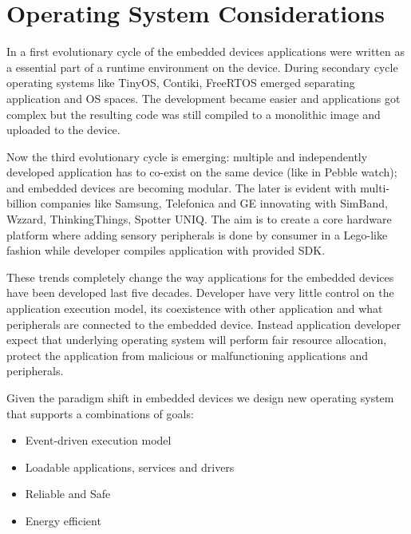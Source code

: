 \section{Operating System Considerations}
\label{os-considerations}

In a first evolutionary cycle of the embedded devices applications were written
as a essential part of a runtime environment on the device. During secondary
cycle operating systems like TinyOS, Contiki, FreeRTOS emerged separating
application and OS spaces. The development became easier  and applications
got complex but the resulting code was still compiled to a monolithic image and
uploaded to the device.

Now the third evolutionary cycle is emerging: multiple and independently
developed application has to co-exist on the same device (like in Pebble watch);
and embedded devices are becoming modular. The later is evident with
multi-billion companies like Samsung, Telefonica and GE innovating with SimBand, Wzzard, ThinkingThings, Spotter UNIQ.
The aim is to create a core hardware platform where adding sensory
peripherals is done by consumer in a Lego-like fashion while developer compiles
application with provided SDK.

These trends completely change the way applications for the embedded devices
have been developed last five decades. Developer have very little control on the
application execution model, its coexistence with other application and what
peripherals are connected to the embedded device. Instead application developer
expect that underlying operating system will perform fair resource allocation,
protect the application from malicious or malfunctioning applications and
peripherals. 

Given the paradigm shift in embedded devices we design new operating system
\name that supports a combinations of goals:


\begin{itemize}
  \item Event-driven execution model
  \item Loadable applications, services and drivers
  \item Reliable and Safe %
  \item Energy efficient 
\end{itemize}

